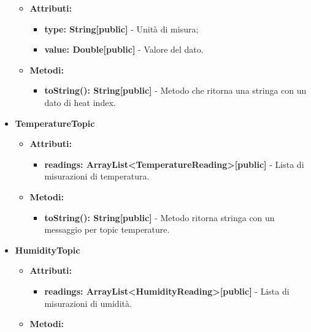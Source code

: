 \documentclass[8pt]{article}
\begin{document}
\begin{itemize}
\begin{itemize}
        \item \textbf{Attributi:}
        \begin{itemize}
            \item \textbf{type: String[public]} - Unità di misura;
            \item \textbf{value: Double[public]} - Valore del dato.
        \end{itemize}
    \end{itemize}
    \begin{itemize}
        \item \textbf{Metodi:}
        \begin{itemize}
            \item \textbf{toString(): String[public]} - Metodo che ritorna una stringa con un dato di heat index.
        \end{itemize}
    \end{itemize}
    \item \textbf{TemperatureTopic}
    \begin{itemize}
        \item \textbf{Attributi:}
        \begin{itemize}
            \item \textbf{readings: ArrayList<TemperatureReading>[public]} - Lista di misurazioni di temperatura.
        \end{itemize}
    \end{itemize}
    \begin{itemize}
        \item \textbf{Metodi:}
        \begin{itemize}
            \item \textbf{toString(): String[public]} - Metodo ritorna stringa con un messaggio per topic temperature.
        \end{itemize}
    \end{itemize}
    \item \textbf{HumidityTopic}
    \begin{itemize}
        \item \textbf{Attributi:}
        \begin{itemize}
            \item \textbf{readings: ArrayList<HumidityReading>[public]} - Lista di misurazioni di umidità.
        \end{itemize}
    \end{itemize}
    \begin{itemize}
        \item \textbf{Metodi:}

\end{itemize}
\end{itemize}
\end{document}
